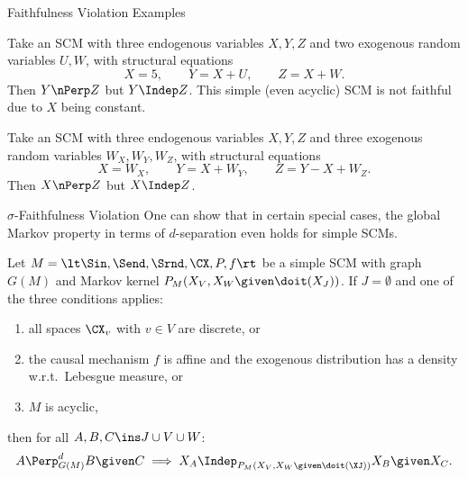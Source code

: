 \begin{frame}{Faithfulness Violation Examples}
\begin{Eg}[Determinism]
  Take an SCM with three endogenous variables $X,Y,Z$ and two exogenous random variables $U,W$, with structural equations
  $$X = 5, \qquad Y = X + U, \qquad Z = X + W.$$
  Then $Y \nPerp Z$ but $Y \Indep Z$.
  This simple (even acyclic) SCM is not faithful due to $X$ being constant.
\end{Eg}

\begin{Eg}
  Take an SCM with three endogenous variables $X,Y,Z$ and three exogenous random variables $W_X,W_Y,W_Z$, with structural equations
  $$X = W_X, \qquad Y = X + W_Y, \qquad Z = Y - X + W_Z.$$
  Then $X \nPerp Z$ but $X \Indep Z$.
\end{Eg}
\end{frame}

\begin{frame}{$\sigma$-Faithfulness Violation}
One can show that in certain special cases, the global Markov property in terms of $d$-separation even holds for simple SCMs.
\begin{Prp}[\ref{prp:when_d-separation_holds}]
  Let $M = \lt \Sin, \Send, \Srnd, \CX, P, f \rt$ be a simple SCM with graph $G(M)$
  and Markov kernel $P_{M}(X_V,X_W \given \doit(X_J))$.
  If $J = \emptyset$ and one of the three conditions applies:
  \begin{enumerate}
    \item all spaces $\CX_v$ with $v \in V$ are discrete, or
    \item the causal mechanism $f$ is affine and the exogenous distribution has a density w.r.t.\ Lebesgue measure, or
    \item $M$ is acyclic,
  \end{enumerate} 
  then for all $A, B, C \ins J \cup V \cup W$:
  $$A \Perp^d_{G(M)} B \given C \implies X_A \Indep_{P_{M}(X_V,X_W \given \doit(\XJ))} X_B \given X_C.$$
\end{Prp}
\end{frame}
